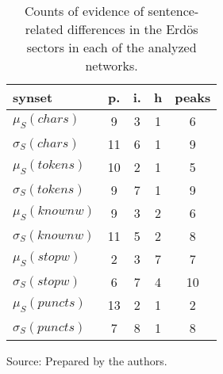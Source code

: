 \begin{table}[h!]
\begin{center}
\caption{Counts of evidence of sentence-related differences in the Erd\"os sectors in each of the analyzed networks.}
\begin{tabular}{| l || c | c | c || c |}\hline
{\bf synset} & {\bf p.} & {\bf i.} & {\bf h} & {\bf peaks} \\\hline\hline
$\mu_S(chars)$ & 9  & 3  & 1  & 6 \\
$\sigma_S(chars)$ & 11  & 6  & 1  & 9 \\\hline
$\mu_S(tokens)$ & 10  & 2  & 1  & 5 \\
$\sigma_S(tokens)$ & 9  & 7  & 1  & 9 \\\hline
$\mu_S(knownw)$ & 9  & 3  & 2  & 6 \\
$\sigma_S(knownw)$ & 11  & 5  & 2  & 8 \\\hline
$\mu_S(stopw)$ & 2  & 3  & 7  & 7 \\
$\sigma_S(stopw)$ & 6  & 7  & 4  & 10 \\\hline
$\mu_S(puncts)$ & 13  & 2  & 1  & 2 \\
$\sigma_S(puncts)$ & 7  & 8  & 1  & 8 \\\hline
\end{tabular}
\begin{flushleft}
		Source: Prepared by the authors.\
\end{flushleft}
\end{center}
\end{table}
